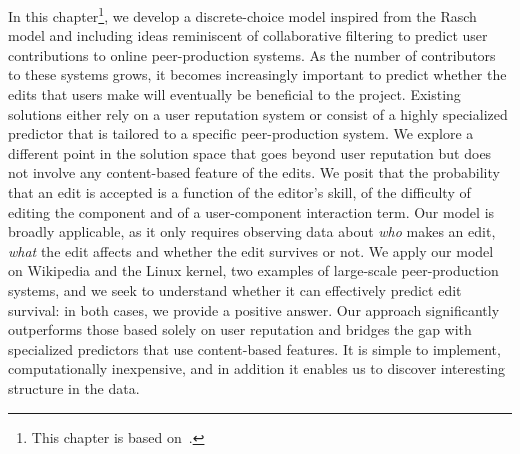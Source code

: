 
In this chapter\footnote{This chapter is based on~\citet{yardim2018can}.}, we develop a discrete-choice model inspired from the Rasch model and including ideas reminiscent of collaborative filtering to predict user contributions to online peer-production systems.
As the number of contributors to these systems grows, it becomes increasingly important to predict whether the edits that users make will eventually be beneficial to the project.
Existing solutions either rely on a user reputation system or consist of a highly specialized predictor that is tailored to a specific peer-production system.
We explore a different point in the solution space that goes beyond user reputation but does not involve any content-based feature of the edits.
We posit that the probability that an edit is accepted is a function of the editor's skill, of the difficulty of editing the component and of a user-component interaction term.
Our model is broadly applicable, as it only requires observing data about \emph{who} makes an edit, \emph{what} the edit affects and whether the edit survives or not.
We apply our model on Wikipedia and the Linux kernel, two examples of large-scale peer-production systems, and we seek to understand whether it can effectively predict edit survival:
in both cases, we provide a positive answer.
Our approach significantly outperforms those based solely on user reputation and bridges the gap with specialized predictors that use content-based features.
It is simple to implement, computationally inexpensive, and in addition it enables us to discover interesting structure in the data.

